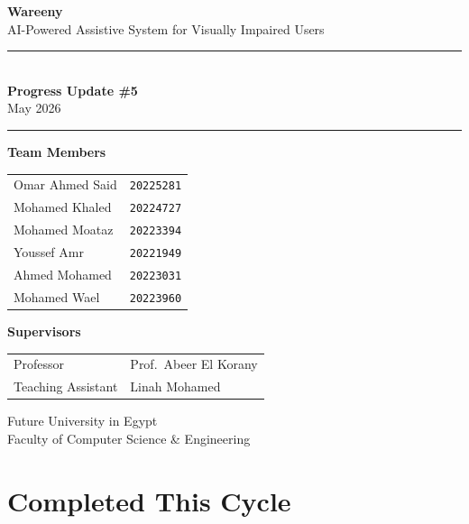 \documentclass[12pt, a4paper]{article}
\begin{document}
\begin{titlepage}
  \centering
  \vspace*{3cm}

  {\Huge\bfseries\color{primary} Wareeny}\\[0.4cm]
  {\large\color{gray} AI-Powered Assistive System for Visually Impaired Users}

  \vspace{1.5cm}
  \rule{0.6\textwidth}{1pt}\\[0.5cm]
  {\LARGE\bfseries Progress Update \#5}\\[0.2cm]
  {\large\color{gray} May 2026}\\[0.5cm]
  \rule{0.6\textwidth}{1pt}

  \vspace{2cm}

  {\large\bfseries Team Members}\\[0.4cm]
  \begin{tabular}{ll}
    Omar Ahmed Said  & \texttt{20225281} \\[4pt]
    Mohamed Khaled   & \texttt{20224727} \\[4pt]
    Mohamed Moataz   & \texttt{20223394} \\[4pt]
    Youssef Amr      & \texttt{20221949} \\[4pt]
    Ahmed Mohamed    & \texttt{20223031} \\[4pt]
    Mohamed Wael     & \texttt{20223960} \\
  \end{tabular}

  \vspace{1.5cm}

  {\large\bfseries Supervisors}\\[0.4cm]
  \begin{tabular}{ll}
    Professor          & Prof.\ Abeer El Korany \\[4pt]
    Teaching Assistant & Linah Mohamed \\
  \end{tabular}

  \vspace{2cm}
  {\small\color{gray} Future University in Egypt \\ Faculty of Computer Science \& Engineering}
\end{titlepage}

\section{Completed This Cycle}
\end{document}
